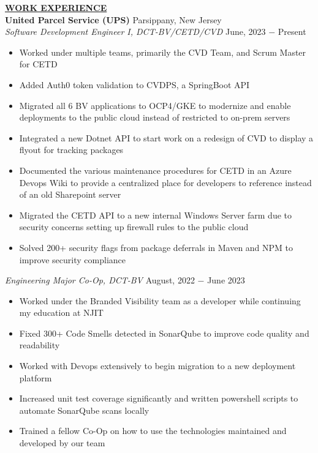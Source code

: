 \documentclass{article}
\begin{document}
% 
%
\noindent \textbf{\underline{WORK EXPERIENCE}} \\
\noindent \textbf{United Parcel Service (UPS)} \hfill Parsippany, New Jersey \\
\textit{Software Development Engineer I, DCT-BV/CETD/CVD} \hfill June, 2023 $-$ Present
\begin{itemize}[noitemsep,nolistsep,leftmargin=*]
\item {Worked under multiple teams, primarily the CVD Team, and Scrum Master for CETD}
\item {Added Auth0 token validation to CVDPS, a SpringBoot API}
\item {Migrated all 6 BV applications to OCP4/GKE to modernize and enable deployments to the public cloud instead of restricted to on-prem servers}
\item {Integrated a new Dotnet API to start work on a redesign of CVD to display a flyout for tracking packages}
\item {Documented the various maintenance procedures for CETD in an Azure Devops Wiki to provide a centralized place for developers to reference instead of an old Sharepoint server}
\item {Migrated the CETD API to a new internal Windows Server farm due to security concerns setting up firewall rules to the public cloud}
\item {Solved 200+ security flags from package deferrals in Maven and NPM to improve security compliance}
\end{itemize}\textit{Engineering Major Co-Op, DCT-BV} \hfill August, 2022 $-$ June 2023
\begin{itemize}[noitemsep,nolistsep,leftmargin=*]
\item {Worked under the Branded Visibility team as a developer while continuing my education at NJIT}
\item {Fixed 300+ Code Smells detected in SonarQube to improve code quality and readability}
\item {Worked with Devops extensively to begin migration to a new deployment platform}
\item {Increased unit test coverage significantly and written powershell scripts to automate SonarQube scans locally}
\item {Trained a fellow Co-Op on how to use the technologies maintained and developed by our team}
\end{itemize}
\end{document}
